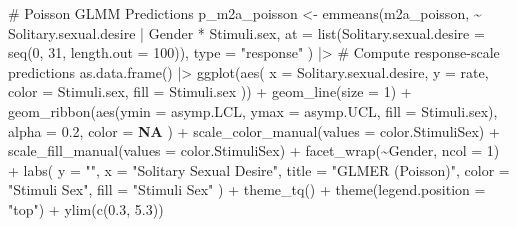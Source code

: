 \documentclass[
  bookmarksnumbered]{article}
\newenvironment{Shaded}{\begin{snugshade}}{\end{snugshade}}
\newcommand{\AttributeTok}[1]{\textcolor[rgb]{0.80,0.80,0.80}{#1}}
\newcommand{\CommentTok}[1]{\textcolor[rgb]{0.50,0.62,0.50}{#1}}
\newcommand{\ConstantTok}[1]{\textcolor[rgb]{0.86,0.64,0.64}{\textbf{#1}}}
\newcommand{\DecValTok}[1]{\textcolor[rgb]{0.86,0.86,0.80}{#1}}
\newcommand{\FloatTok}[1]{\textcolor[rgb]{0.75,0.75,0.82}{#1}}
\newcommand{\FunctionTok}[1]{\textcolor[rgb]{0.94,0.94,0.56}{#1}}
\newcommand{\NormalTok}[1]{\textcolor[rgb]{0.80,0.80,0.80}{#1}}
\newcommand{\OtherTok}[1]{\textcolor[rgb]{0.94,0.94,0.56}{#1}}
\newcommand{\SpecialCharTok}[1]{\textcolor[rgb]{0.86,0.64,0.64}{#1}}
\newcommand{\StringTok}[1]{\textcolor[rgb]{0.80,0.58,0.58}{#1}}
\begin{document}
\begin{Shaded}
\begin{Highlighting}[]
\CommentTok{\# Poisson GLMM Predictions}
\NormalTok{p\_m2a\_poisson }\OtherTok{\textless{}{-}} \FunctionTok{emmeans}\NormalTok{(m2a\_poisson, }\SpecialCharTok{\textasciitilde{}}\NormalTok{ Solitary.sexual.desire }\SpecialCharTok{|}\NormalTok{ Gender }\SpecialCharTok{*}\NormalTok{ Stimuli.sex,}
  \AttributeTok{at =} \FunctionTok{list}\NormalTok{(}\AttributeTok{Solitary.sexual.desire =} \FunctionTok{seq}\NormalTok{(}\DecValTok{0}\NormalTok{, }\DecValTok{31}\NormalTok{, }\AttributeTok{length.out =} \DecValTok{100}\NormalTok{)),}
  \AttributeTok{type =} \StringTok{"response"}
\NormalTok{) }\SpecialCharTok{|\textgreater{}} \CommentTok{\# Compute response{-}scale predictions}
  \FunctionTok{as.data.frame}\NormalTok{() }\SpecialCharTok{|\textgreater{}}
  \FunctionTok{ggplot}\NormalTok{(}\FunctionTok{aes}\NormalTok{(}
    \AttributeTok{x =}\NormalTok{ Solitary.sexual.desire, }\AttributeTok{y =}\NormalTok{ rate,}
    \AttributeTok{color =}\NormalTok{ Stimuli.sex, }\AttributeTok{fill =}\NormalTok{ Stimuli.sex}
\NormalTok{  )) }\SpecialCharTok{+}
  \FunctionTok{geom\_line}\NormalTok{(}\AttributeTok{size =} \DecValTok{1}\NormalTok{) }\SpecialCharTok{+}
  \FunctionTok{geom\_ribbon}\NormalTok{(}\FunctionTok{aes}\NormalTok{(}\AttributeTok{ymin =}\NormalTok{ asymp.LCL, }\AttributeTok{ymax =}\NormalTok{ asymp.UCL, }\AttributeTok{fill =}\NormalTok{ Stimuli.sex),}
    \AttributeTok{alpha =} \FloatTok{0.2}\NormalTok{, }\AttributeTok{color =} \ConstantTok{NA}
\NormalTok{  ) }\SpecialCharTok{+}
  \FunctionTok{scale\_color\_manual}\NormalTok{(}\AttributeTok{values =}\NormalTok{ color.StimuliSex) }\SpecialCharTok{+}
  \FunctionTok{scale\_fill\_manual}\NormalTok{(}\AttributeTok{values =}\NormalTok{ color.StimuliSex) }\SpecialCharTok{+}
  \FunctionTok{facet\_wrap}\NormalTok{(}\SpecialCharTok{\textasciitilde{}}\NormalTok{Gender, }\AttributeTok{ncol =} \DecValTok{1}\NormalTok{) }\SpecialCharTok{+}
  \FunctionTok{labs}\NormalTok{(}
    \AttributeTok{y =} \StringTok{""}\NormalTok{, }\AttributeTok{x =} \StringTok{"Solitary Sexual Desire"}\NormalTok{,}
    \AttributeTok{title =} \StringTok{"GLMER (Poisson)"}\NormalTok{,}
    \AttributeTok{color =} \StringTok{"Stimuli Sex"}\NormalTok{, }\AttributeTok{fill =} \StringTok{"Stimuli Sex"}
\NormalTok{  ) }\SpecialCharTok{+}
  \FunctionTok{theme\_tq}\NormalTok{() }\SpecialCharTok{+}
  \FunctionTok{theme}\NormalTok{(}\AttributeTok{legend.position =} \StringTok{"top"}\NormalTok{) }\SpecialCharTok{+}
  \FunctionTok{ylim}\NormalTok{(}\FunctionTok{c}\NormalTok{(}\FloatTok{0.3}\NormalTok{, }\FloatTok{5.3}\NormalTok{))}


\end{Highlighting}
\end{Shaded}
\end{document}
